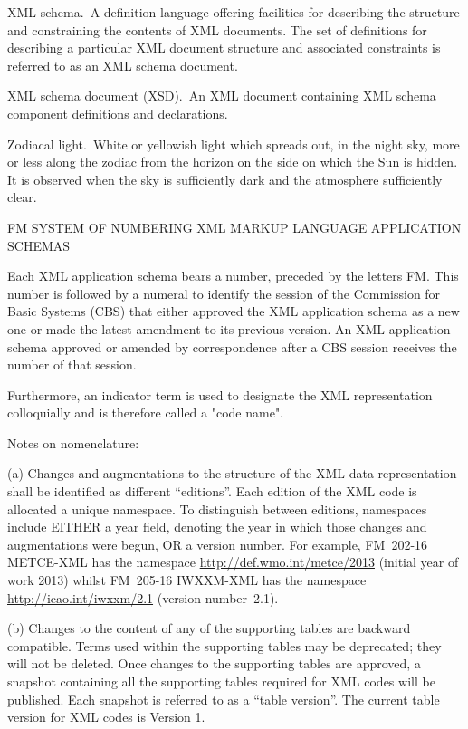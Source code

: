 XML schema. A definition language offering facilities for describing the structure and constraining the contents of XML documents. The set of definitions for describing a particular XML document structure and associated constraints is referred to as an XML schema document.

XML schema document (XSD). An XML document containing XML schema component definitions and declarations.

Zodiacal light. White or yellowish light which spreads out, in the night sky, more or less along the zodiac from the horizon on the side on which the Sun is hidden. It is observed when the sky is sufficiently dark and the atmosphere sufficiently clear.

FM SYSTEM OF NUMBERING XML MARKUP LANGUAGE APPLICATION SCHEMAS

Each XML application schema bears a number, preceded by the letters FM. This number is followed by a numeral to identify the session of the Commission for Basic Systems (CBS) that either approved the XML application schema as a new one or made the latest amendment to its previous version. An XML application schema approved or amended by correspondence after a CBS session receives the number of that session.

Furthermore, an indicator term is used to designate the XML representation colloquially and is therefore called a "code name".

Notes on nomenclature:

(a) Changes and augmentations to the structure of the XML data representation shall be identified as different ``editions''. Each edition of the XML code is allocated a unique namespace. To distinguish between editions, namespaces include EITHER a year field, denoting the year in which those changes and augmentations were begun, OR a version number. For example, FM~202-16 METCE-XML has the namespace \url{http://def.wmo.int/metce/2013} (initial year of work 2013) whilst FM~205-16 IWXXM-XML has the namespace \url{http://icao.int/iwxxm/2.1} (version number~2.1).

(b) Changes to the content of any of the supporting tables are backward compatible. Terms used within the supporting tables may be deprecated; they will not be deleted. Once changes to the supporting tables are approved, a snapshot containing all the supporting tables required for XML codes will be published. Each snapshot is referred to as a ``table version''. The current table version for XML codes is Version 1.

